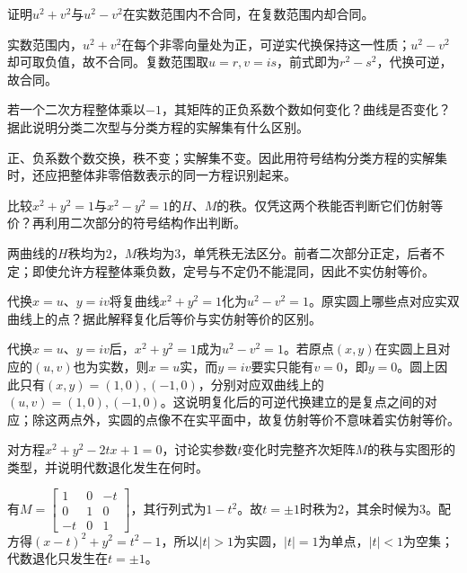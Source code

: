 证明\(u^2+v^2\)与\(u^2-v^2\)在实数范围内不合同，在复数范围内却合同。
\par
\solutionanswer
实数范围内，\(u^2+v^2\)在每个非零向量处为正，可逆实代换保持这一性质；\(u^2-v^2\)却可取负值，故不合同。复数范围取\(u=r,v=is\)，前式即为\(r^2-s^2\)，代换可逆，故合同。


若一个二次方程整体乘以\(-1\)，其矩阵的正负系数个数如何变化？曲线是否变化？据此说明分类二次型与分类方程的实解集有什么区别。
\par
\solutionanswer
正、负系数个数交换，秩不变；实解集不变。因此用符号结构分类方程的实解集时，还应把整体非零倍数表示的同一方程识别起来。


比较\(x^2+y^2=1\)与\(x^2-y^2=1\)的\(H\)、\(M\)的秩。仅凭这两个秩能否判断它们仿射等价？再利用二次部分的符号结构作出判断。
\par
\solutionanswer
两曲线的\(H\)秩均为\(2\)，\(M\)秩均为\(3\)，单凭秩无法区分。前者二次部分正定，后者不定；即使允许方程整体乘负数，定号与不定仍不能混同，因此不实仿射等价。


代换\(x=u\)、\(y=iv\)将复曲线\(x^2+y^2=1\)化为\(u^2-v^2=1\)。原实圆上哪些点对应实双曲线上的点？据此解释复化后等价与实仿射等价的区别。
\par
\solutionanswer
代换\(x=u\)、\(y=iv\)后，\(x^2+y^2=1\)成为\(u^2-v^2=1\)。若原点\((x,y)\)在实圆上且对应的\((u,v)\)也为实数，则\(x=u\)实，而\(y=iv\)要实只能有\(v=0\)，即\(y=0\)。圆上因此只有\((x,y)=(1,0),(-1,0)\)，分别对应双曲线上的\((u,v)=(1,0),(-1,0)\)。这说明复化后的可逆代换建立的是复点之间的对应；除这两点外，实圆的点像不在实平面中，故复仿射等价不意味着实仿射等价。


对方程\(x^2+y^2-2tx+1=0\)，讨论实参数\(t\)变化时完整齐次矩阵\(M\)的秩与实图形的类型，并说明代数退化发生在何时。
\par
\solutionanswer
有\(M=\begin{bmatrix}1&0&-t\\0&1&0\\-t&0&1\end{bmatrix}\)，其行列式为\(1-t^2\)。故\(t=\pm1\)时秩为\(2\)，其余时候为\(3\)。配方得\((x-t)^2+y^2=t^2-1\)，所以\(|t|>1\)为实圆，\(|t|=1\)为单点，\(|t|<1\)为空集；代数退化只发生在\(t=\pm1\)。


